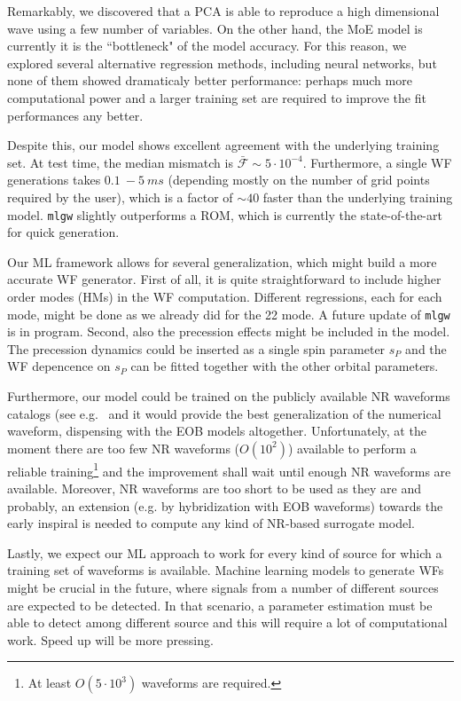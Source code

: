 Remarkably, we discovered that a PCA is able to reproduce a high dimensional wave using a few number of variables.
On the other hand, the MoE model is currently it is the ``bottleneck" of the model accuracy. For this reason, we explored several alternative regression methods, including neural networks, but none of them showed dramaticaly better performance: perhaps much more computational power and a larger training set are required to improve the fit performances any better.
\par
Despite this, our model shows excellent agreement with the underlying training set. At test time, the median mismatch is $\bar{\mathcal{F}}\sim 5 \cdot 10^{-4}$.
Furthermore, a single WF generations takes $\SI{0.1}{}-\SI{5}{ms}$ (depending mostly on the number of grid points required by the user), which is a factor of $\sim 40$ faster than the underlying training model.
\texttt{mlgw} slightly outperforms a ROM, which is currently the state-of-the-art for quick generation.
\par
Our ML framework allows for several generalization, which might build a more accurate WF generator.
First of all, it is quite straightforward to include higher order modes (HMs) in the WF computation. Different regressions, each for each mode, might be done as we already did for the 22 mode. A future update of \texttt{mlgw} is in program.
Second, also the precession effects might be included in the model.
The precession dynamics could be inserted as a single spin parameter $s_P$ \cite{Schmidt2015Precession} and the WF depencence on $s_P$ can be fitted together with the other orbital parameters.
\par
Furthermore, our model could be trained on the publicly available NR waveforms 
catalogs (see e.g.~\cite{Mroue:2013xna,Boyle:2019kee,Healy:2019jyf} and it would provide the best generalization of 
the numerical waveform, dispensing with the EOB models altogether.
Unfortunately, at the moment there are too few NR waveforms ($O(10^2)$) available to perform a reliable 
training\footnote{At least $O(5\cdot 10^3)$ waveforms are required.}
and the improvement shall wait until enough NR waveforms are available.
Moreover, NR waveforms are too short to be used as they are and probably, an extension (e.g. by hybridization with EOB waveforms)
towards the early inspiral is needed to compute any kind of NR-based surrogate model.
\par
Lastly, we expect our ML approach to work for every kind of source for which a training set of 
waveforms is available. Machine learning models to generate WFs might be crucial in 
the future, where signals from a number of different sources are expected to be detected. In that scenario, 
a parameter estimation must be able to detect among different source and this will require a lot 
of computational work. Speed up will be more pressing.
\par

